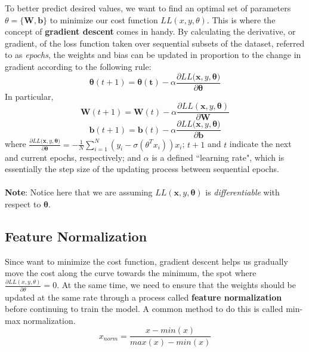 \documentclass{article}
\begin{document}
To better predict desired values, we want to find an optimal set of parameters $\theta = \{\textbf{W},\textbf{b}\}$ to minimize our cost function $LL(x,y,\theta)$. This is where the concept of \textbf{gradient descent} comes in handy. By calculating the derivative, or gradient, of the loss function taken over sequential subsets of the dataset, referred to as \textit{epochs}, the weights and bias can be updated in proportion to the change in gradient according to the following rule:
\[
\mathbf{\theta}(t+1)=\mathbf{\theta(t)}-\alpha\frac{\partial LL(\mathbf{x},y,\mathbf{\theta)}}{\partial\mathbf{\theta}}
\]
In particular,
\[
\mathbf{W}(t+1)=\mathbf{W}(t)-\alpha\frac{\partial LL(\mathbf{x},y,\mathbf{\theta})}{\partial \mathbf{W}}
\]
\[
\mathbf{b}(t+1)=\mathbf{b}(t)-\alpha\frac{\partial LL(\mathbf{x},y,\mathbf{\theta)}}{\partial \mathbf{b}}
\]
where $\frac{\partial LL(\mathbf{x},y,\mathbf{\theta)}}{\partial\mathbf{\theta}} = -\frac{1}{N}\sum_{i=1}^{N}(y_i-\sigma(\theta^{T}x_i))x_i$; $t+1$ and $t$ indicate the next and current epochs, respectively; and $\alpha$ is a defined ``learning rate", which is essentially the step size of the updating process between sequential epochs.
\\ \\
\textbf{Note}: Notice here that we are assuming $LL(\mathbf{x},y,\mathbf{\theta})$ is \textit{differentiable} with respect to $\mathbf{\theta}$.

\subsection{Feature Normalization}
Since want to minimize the cost function, gradient descent helps us gradually move the cost along the curve towards the minimum, the spot where $\frac{\partial LL(x,y,\theta)}{\partial\theta} = 0$. At the same time, we need to ensure that the weights should be updated at the same rate through a process called \textbf{feature normalization} before continuing to train the model. A common method to do this is called min-max normalization.
\[
x_{norm} = \frac{x-min(x)}{max(x)-min(x)}
\]
\end{document}
